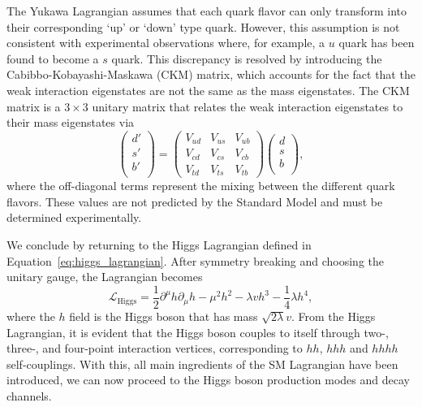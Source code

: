 The Yukawa Lagrangian assumes that each quark flavor can only transform into their corresponding `up' or `down' type quark. However, this assumption is not consistent with experimental observations where, for example, a $u$ quark has been found to become a $s$ quark. This discrepancy is resolved by introducing the Cabibbo-Kobayashi-Maskawa (CKM) matrix, which accounts for the fact that the weak interaction eigenstates are not the same as the mass eigenstates. The CKM matrix is a $3\times3$ unitary matrix that relates the weak interaction eigenstates to their mass eigenstates via
\begin{equation}
  \begin{pmatrix}
    d' \\
    s' \\
    b' \\
  \end{pmatrix}
  = \begin{pmatrix}
    V_{ud} & V_{us} & V_{ub} \\
    V_{cd} & V_{cs} & V_{cb} \\
    V_{td} & V_{ts} & V_{tb}
  \end{pmatrix}
  \begin{pmatrix}
    d \\
    s \\
    b \\
  \end{pmatrix},
  \label{eq:ckm_matrix}
\end{equation}
where the off-diagonal terms represent the mixing between the different quark flavors. These values are not predicted by the Standard Model and must be determined experimentally. 

We conclude by returning to the Higgs Lagrangian defined in Equation~\ref{eq:higgs_lagrangian}. After symmetry breaking and choosing the unitary gauge, the Lagrangian becomes
\begin{equation}
  \mathcal{L}_{\mathrm{Higgs}} = \frac{1}{2}\partial^{\mu}h\partial_{\mu}h - \mu^{2}h^{2} - \lambda v h^{3} - \frac{1}{4}\lambda h^{4},
\end{equation}
where the $h$ field is the Higgs boson that has mass $\sqrt{2\lambda}v$. From the Higgs Lagrangian, it is evident that the Higgs boson couples to itself through two-, three-, and four-point interaction vertices, corresponding to $hh$, $hhh$ and $hhhh$ self-couplings. With this, all main ingredients of the SM Lagrangian have been introduced, we can now proceed to the Higgs boson production modes and decay channels.